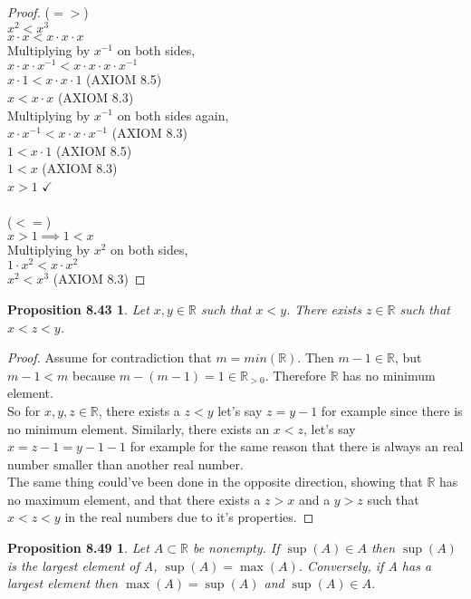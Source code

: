 \documentclass[12pt]{amsart}
\newcommand{\R}{\mathbb{R}}
\begin{document}
\begin{proof}
	($=>$)\\
	$x^2<x^3$ \\
	$x \cdot x < x \cdot x \cdot x$ \\
	Multiplying by $x^{-1}$ on both sides, \\
	$x \cdot x \cdot x^{-1} < x \cdot x \cdot x \cdot x^{-1}$ \\
	$x \cdot 1 < x \cdot x \cdot 1$ (AXIOM 8.5)\\
	$x < x \cdot x$ (AXIOM 8.3) \\
	Multiplying by $x^{-1}$ on both sides again, \\
	$x \cdot x^{-1} < x \cdot x \cdot x^{-1}$ (AXIOM 8.3) \\
	$1 < x \cdot 1$ (AXIOM 8.5) \\
	$1 < x$ (AXIOM 8.3)\\
	$x > 1$ $\checkmark$ \\\\
	
	($<=$)\\
	$x>1 \implies 1<x$ \\
	Multiplying by $x^2$ on both sides, \\
	$1 \cdot x^2 < x \cdot x^2$ \\
	$x^2 < x^3$ (AXIOM 8.3)
\end{proof}

\newtheorem*{prop8.43}{Proposition 8.43}
\begin{prop8.43}
	Let $x,y \in \R$ such that $x < y$. There exists $z \in \R$ such that $x < z < y$.
\end{prop8.43}

\begin{proof}
	Assume for contradiction that $m = min(\R)$. Then $m-1 \in \R$, but $m-1 < m$ because $m-(m-1) = 1 \in \R_{>0}$. Therefore $\R$ has no minimum element. \\
	So for $x,y,z \in \R$, there exists a $z < y$ let's say $z=y-1$ for example since there is no minimum element. Similarly, there exists an $x < z$, let's say $x = z-1 = y-1-1$ for example for the same reason that there is always an real number smaller than another real number. \\
	The same thing could've been done in the opposite direction, showing that $\R$ has no maximum element, and that there exists a $z>x$ and a $y>z$ such that $x<z<y$ in the real numbers due to it's properties.
\end{proof}

\newtheorem*{prop8.49}{Proposition 8.49}
\begin{prop8.49}
	Let $A \subset \R$ be nonempty. If $\sup(A) \in A$ then $\sup(A)$ is the largest element of A, $\sup(A) = \max(A)$. Conversely, if A has a largest element then $\max(A) = \sup(A)$ and $\sup(A) \in A$.
\end{prop8.49}
\end{document}
